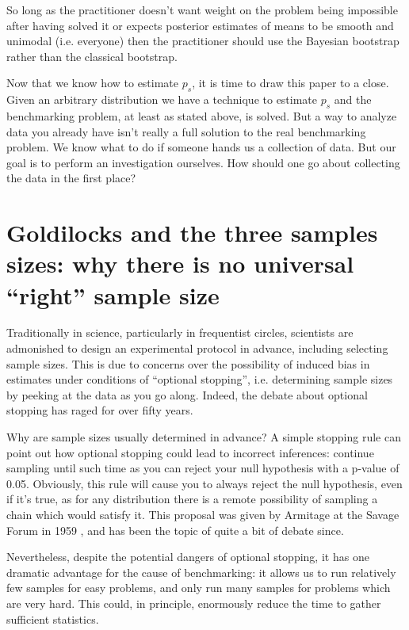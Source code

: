 So long as the practitioner doesn't want weight on the problem being impossible after having solved it or expects posterior estimates of means to be smooth and unimodal (i.e. everyone) then the practitioner should use the Bayesian bootstrap rather than the classical bootstrap.

Now that we know how to estimate $p_s$, it is time to draw this paper to a close. Given an arbitrary distribution we have a technique to estimate $p_s$ and the benchmarking problem, at least as stated above, is solved. But a way to analyze data you already have isn't really a full solution to the real benchmarking problem. We know what to do if someone hands us a collection of data. But our goal is to perform an investigation ourselves. How should one go about collecting the data in the first place?

\section{Goldilocks and the three samples sizes: why there is no universal ``right'' sample size}
Traditionally in science, particularly in frequentist circles, scientists are admonished to design an experimental protocol in advance, including selecting sample sizes. This is due to concerns over the possibility of induced bias in estimates under conditions of ``optional stopping'', i.e. determining sample sizes by peeking at the data as you go along. Indeed, the debate about optional stopping has raged for over fifty years.

Why are sample sizes usually determined in advance? A simple stopping rule can point out how optional stopping could lead to incorrect inferences: continue sampling until such time as you can reject your null hypothesis with a p-value of 0.05. Obviously, this rule will cause you to always reject the null hypothesis, even if it's true, as for any distribution there is a remote possibility of sampling a chain which would satisfy it. This proposal was given by Armitage at the Savage Forum in 1959 \cite{mayo2001}, and has been the topic of quite a bit of debate since.

Nevertheless, despite the potential dangers of optional stopping, it has one dramatic advantage for the cause of benchmarking: it allows us to run relatively few samples for easy problems, and only run many samples for problems which are very hard. This could, in principle, enormously reduce the time to gather sufficient statistics.

